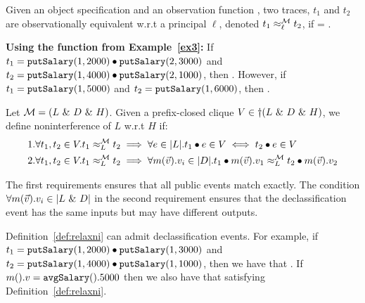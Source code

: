 \documentclass[acmsmall,screen,review, nonacm]{acmart}
\begin{document}
\begin{definition}\label{def:obsim}
Given an object specification \classpart and an observation function \obsymbol,  two traces, $t_1$ and $t_2$ are observationally equivalent w.r.t a principal $\ell$, denoted $t_1 \obsim{\ell}{\classpart} t_2$, if  =  .
\end{definition}


\textbf{Using the \obsymbol function from Example~\ref{ex3}: }
If $t_1 = \mycode{putSalary}(1, 2000) \tracecat \mycode{putSalary}(2, 3000)$ and  $t_2 = \mycode{putSalary}(1, 4000) \tracecat \mycode{putSalary}(2, 1000)$, then .
However, if $t_1 = \mycode{putSalary}(1, 5000)$ and  $t_2 = \mycode{putSalary}(1, 6000)$, then   .

{
\color{red}
\begin{definition}\label{def:relaxni}
   Let $\classpart = (L \directprod D \directprod H)$. Given a prefix-closed clique $V \in \dagger(L \directprod D \directprod H)$, we define noninterference of $L$ w.r.t $H$ if:
  \begin{align*}
   & 1. \forall t_1, t_2 \in V. \treq{t_1}{t_2}{L}{\classpart}  \implies \forall e \in \abs{L}. t_1  \tracecat e \in V \iff t_2 \tracecat e \in V  \\
   & 2. \forall t_1, t_2 \in V. \treq{t_1}{t_2}{L}{\classpart}  \implies \forall m(\vec{v}).v_i \in \abs{D}. \treq{t_1  \tracecat  m(\vec{v}).v_1}{t_2 \tracecat  m(\vec{v}).v_2}{L}{\classpart}
  \end{align*}
\end{definition}

The first requirements ensures that all public events match exactly.
The condition $\forall m(\vec{v}).v_i \in \abs{L \directprod D}$ in the second requirement ensures that the declassification event has the same inputs but may have different outputs.


Definition~\ref{def:relaxni} can admit declassification events. For example, if $t_1 = \mycode{putSalary}(1, 2000) \tracecat \mycode{putSalary}(1, 3000)$ and  $t_2 = \mycode{putSalary}(1, 4000) \tracecat \mycode{putSalary}(1, 1000)$, then we have that .
If $m().v=\mycode{avgSalary}().5000$ then we also have that  satisfying Definition~\ref{def:relaxni}.
}
\end{document}
